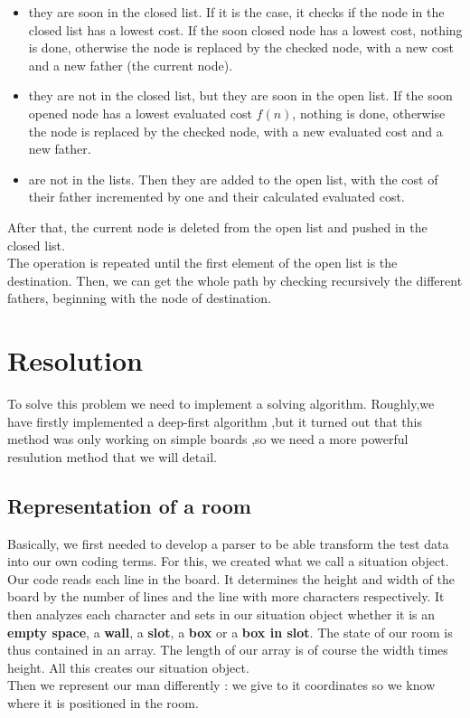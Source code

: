 \documentclass[journal]{IEEEtran}
\begin{document}
\begin{itemize}

\item they are soon in the closed list. If it is the case, it checks if the node in the closed list has a lowest cost. If the soon closed node has a lowest cost, nothing is done, otherwise the node is replaced by the checked node, with a new cost and a new father (the current node).

\item they are not in the closed list, but they are soon in the open list. If the soon opened node has a lowest evaluated cost $f(n)$, nothing is done, otherwise the node is replaced by the checked node, with a new evaluated cost and a new father.

\item are not in the lists. Then they are added to the open list, with the cost of their father incremented by one and their calculated evaluated cost.

\end{itemize}

After that, the current node is deleted from the open list and pushed in the closed list.\\

The operation is repeated until the first element of the open list is the destination. Then, we can get the whole path by checking recursively the different fathers, beginning with the node of destination.
\section{Resolution}
To solve this problem we need to implement a solving algorithm. Roughly,we have firstly implemented a deep-first algorithm ,but it turned out that this method was only working on simple boards ,so we need a more powerful resulution method that we will detail.

\subsection{Representation of a room}
Basically, we first needed to develop a parser to be able transform the test data into our own coding terms. For this, we created what we call a situation object. Our code reads each line in the board. It determines the height and width of the board by the  number of lines and the line with more characters respectively. It then analyzes each character and sets in our situation object whether it is an  \textbf{empty space}, a \textbf{wall}, a \textbf{slot}, a \textbf{box} or a \textbf{box in slot}. The state of our room is thus contained in an array. The length of our array is of course the width times height. All this creates our situation object.\\
Then we represent our man differently : we give to it coordinates so we know where it is positioned in the room.
\end{document}
